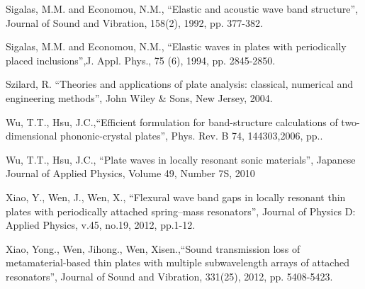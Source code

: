 \documentclass[a4paper]{ICEDyn}
\begin{document}
\begin{thebibliography}{99}
		 Sigalas, M.M. and Economou, N.M., ``Elastic and acoustic wave band structure'', Journal of Sound and Vibration, 158(2), 1992, pp. 377-382.
		
		 Sigalas, M.M. and Economou, N.M., ``Elastic waves in plates with periodically placed inclusions'',J. Appl. Phys., 75 (6), 1994, pp. 2845-2850.
		
		 Szilard, R. ``Theories and applications of plate analysis: classical, numerical and engineering methods'', John Wiley \& Sons, New Jersey, 2004.
		
		 Wu, T.T., Hsu, J.C.,``Efficient formulation for band-structure calculations of two-dimensional phononic-crystal plates'', Phys. Rev. B 74, 144303,2006, pp..
		
		 Wu, T.T., Hsu, J.C.,
		``Plate waves in locally resonant sonic materials'',
		Japanese Journal of Applied Physics, Volume 49, Number 7S, 2010
		
		 Xiao, Y., Wen, J., Wen, X.,	``Flexural wave band gaps in locally resonant thin plates with periodically attached spring–mass resonators'', Journal of Physics D: Applied Physics, v.45, no.19, 2012, pp.1-12.
		
		 Xiao, Yong., Wen, Jihong., Wen, Xisen.,``Sound transmission loss of metamaterial-based thin plates with multiple subwavelength arrays of attached resonators'', Journal of Sound and Vibration, 331(25), 2012, pp. 5408-5423.
					
	\end{thebibliography}
\end{document}
